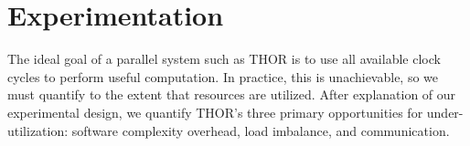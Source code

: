 \documentclass[twoside,leqno,twocolumn]{article}
\newcommand{\authornote}[1]{\footnote{Note to self: #1}}
\newcommand{\authorsnote}[1]{\authornote{#1}}
\begin{document}







\section{Experimentation}

The ideal goal of a parallel system such as THOR is to use all available clock cycles to perform useful computation.
In practice, this is unachievable, so we must quantify to the extent that resources are utilized.
After explanation of our experimental design, we quantify THOR's three primary opportunities for under-utilization: software complexity overhead, load imbalance, and communication.
\end{document}
